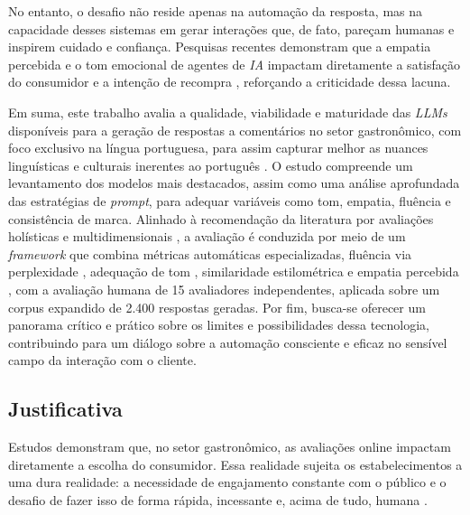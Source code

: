 \documentclass[12pt, a4paper]{article}
\numberwithin{equation}{section}
\begin{document}
No entanto, o desafio não reside apenas na automação da resposta, mas na capacidade desses sistemas em gerar interações que, de fato, pareçam humanas e inspirem cuidado e confiança. Pesquisas recentes demonstram que a empatia percebida e o tom emocional de agentes de \textit{IA} impactam diretamente a satisfação do consumidor e a intenção de recompra \cite{rohden2024}, reforçando a criticidade dessa lacuna.

Em suma, este trabalho avalia a qualidade, viabilidade e maturidade das \textit{LLMs} disponíveis para a geração de respostas a comentários no setor gastronômico, com foco exclusivo na língua portuguesa, para assim capturar melhor as nuances linguísticas e culturais inerentes ao português \cite{araujo2024Explorando}. O estudo compreende um levantamento dos modelos mais destacados, assim como uma análise aprofundada das estratégias de \textit{prompt}, para adequar variáveis como tom, empatia, fluência e consistência de marca. Alinhado à recomendação da literatura por avaliações holísticas e multidimensionais \cite{liang2023,celikyilmaz2021Evaluation}, a avaliação é conduzida por meio de um \textit{framework} que combina métricas automáticas especializadas, fluência via perplexidade \cite{pistotti2025}, adequação de tom \cite{danescu2013}, similaridade estilométrica \cite{abbasi2008} e empatia percebida \cite{barriere2023}, com a avaliação humana de 15 avaliadores independentes, aplicada sobre um corpus expandido de 2.400 respostas geradas. Por fim, busca-se oferecer um panorama crítico e prático sobre os limites e possibilidades dessa tecnologia, contribuindo para um diálogo sobre a automação consciente e eficaz no sensível campo da interação com o cliente.

\subsection{Justificativa}

Estudos demonstram que, no setor gastronômico, as avaliações online impactam diretamente a escolha do consumidor. Essa realidade sujeita os estabelecimentos a uma dura realidade: a necessidade de engajamento constante com o público e o desafio de fazer isso de forma rápida, incessante e, acima de tudo, humana \cite{silva2021Effect}.
\end{document}
